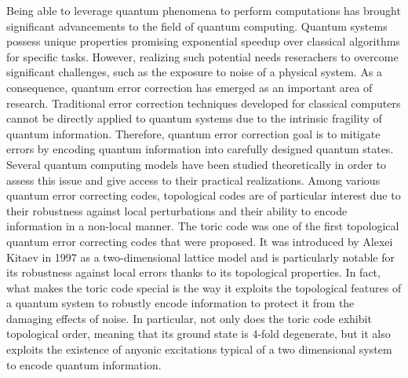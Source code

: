 \documentclass{Configuration_Files/PoliMi3i_thesis}
\begin{document}
Being able to leverage quantum phenomena to perform computations has brought significant 
advancements to the field of quantum computing. Quantum systems possess unique properties promising exponential speedup over classical algorithms for specific tasks. However, realizing such potential 
needs reserachers to overcome significant challenges, such as the exposure to
noise of a physical system. As a consequence, quantum error correction has emerged as an important area of research. Traditional error correction techniques developed for classical computers cannot be directly applied to quantum systems due to the intrinsic fragility of quantum information. Therefore, quantum error correction goal is to mitigate errors by encoding quantum information into carefully designed quantum states. Several quantum computing models have been studied theoretically
in order to assess this issue and give access to their practical realizations. 
Among various quantum error correcting codes, topological codes are of particular interest due to their robustness against local perturbations and their ability to encode information in a non-local manner. \newline
The toric code was one of the first topological quantum error correcting codes that were proposed. It was introduced by Alexei Kitaev in 1997 as a two-dimensional lattice model and is particularly notable for its robustness against local errors thanks to its topological properties. In fact, what makes the toric code special is the way it exploits the topological features of a quantum system to robustly encode information to protect it from the damaging effects of noise. In particular, not only does the toric code exhibit topological order, meaning that its ground state is 4-fold degenerate, but it also exploits the existence of anyonic excitations typical of a two dimensional system to encode quantum information.
\end{document}
